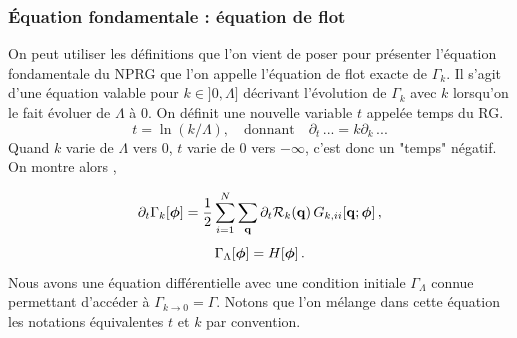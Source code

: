 \documentclass[10.5pt]{article}
\begin{document}
\begin{multicols*}{2}
\subsubsection{Équation fondamentale : équation de flot}

On peut utiliser les définitions que l'on vient de poser pour présenter l'équation fondamentale du NPRG que l'on appelle l'équation de flot exacte de $\Gamma_k$. Il s'agit d'une équation valable pour $k \in ]0, \Lambda]$ décrivant l'évolution de $\Gamma_k$ avec $k$ lorsqu'on le fait évoluer de $\Lambda$ à $0$. On définit une nouvelle variable $t$ appelée temps du RG.
\begin{equation}
	t = \ln(k/\Lambda), \quad \text{donnant} \quad \partial_t \, ... = k\partial_k \, ...
\end{equation}
Quand $k$ varie de $\Lambda$ vers $0$, $t$ varie de $0$ vers $-\infty$, c'est donc un "temps" négatif. On montre alors \cite{Delamotte2012},

\begin{equation}
\partial_t \Gamma_{k}	[\boldsymbol{ \phi}] = \frac{1}{2} \sum\limits_{i=1}^{N} \sum_{\bf q} \partial_t \mathcal{R}_k({\bf q}) \, G_{k, ii}[{\bf q}; \boldsymbol{ \phi}] \, ,
	\label{eq:flot}
\end{equation}
\begin{equation}
	\Gamma_\Lambda [\boldsymbol{ \phi}] = H[\boldsymbol{ \phi}] \, .
	\label{eq:initFlotBMW}
\end{equation}
Nous avons une équation différentielle avec une condition initiale $\Gamma_\Lambda$ connue permettant d'accéder à $\Gamma_{k \to 0} = \Gamma$. Notons que l'on mélange dans cette équation les notations équivalentes $t$ et $k$ par convention. \\




\end{multicols*}
\end{document}
